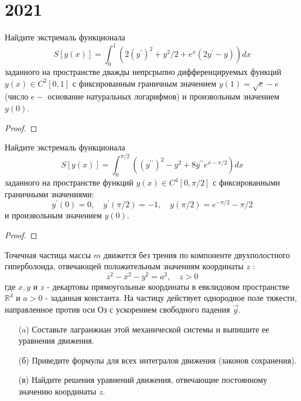 \section{2021}

\begin{prob}
Найдите экстремаль функционала
$$
S[y(x)]=\int_0^1\left(2\left(y^{\prime}\right)^2+y^2 / 2+e^x\left(2 y^{\prime}-y\right)\right) d x
$$
заданного на пространстве дважды непрсрыпно дифференцируемых функций $y(x) \in C^2[0,1]$ с фиксированным граничным значением $y(1)=\sqrt{e}-e$ (число $e-$ основание натуральных логарифмов) и произвольным значением $y(0)$.
\end{prob}

\begin{proof}

\end{proof}
\vskip 0.6in




\begin{prob}
Найдите экстремаль функционала
$$
S[y(x)]=\int_0^{\pi / 2}\left(\left(y^{\prime \prime}\right)^2-y^2+8 y^{\prime \prime} e^{x-\pi / 2}\right) d x
$$
заданного на пространстве функций $y(x) \in C^4[0, \pi / 2]$ с фиксированными граничными значениями:
$$
y^{\prime}(0)=0, \quad y^{\prime}(\pi / 2)=-1, \quad y(\pi / 2)=e^{-\pi / 2}-\pi / 2
$$
и произвольным значением $y(0)$.
\end{prob}

\begin{proof}

\end{proof}
\vskip 0.6in




\begin{prob}
Точечная частица массы $m$ движется без трения по компоненте двухполостного гиперболоида, отвечающей положительным значениям координаты $z$ :
$$
z^2-x^2-y^2=a^2, \quad z>0
$$
где $x, y$ и $z$ - декартовы прямоугольные координаты в евклидовом пространстве $\mathbb{R}^3$ и $a>0$ - заданная константа. На частицу действует однородное поле тяжести, направленное против оси Оз с ускорением свободного падения $\vec{g}$.
\begin{itemize}
\item[]
\item[(a)] Составьте лагранжиан этой механической системы и выпишите ее уравнения движения.
\item[(б)] Приведите формулы для всех интегралов движения (законов сохранения).
\item[(в)] Найдите решения уравнений движения, отвечающие постоянному значению координаты $z$.
\end{itemize}
\end{prob}

